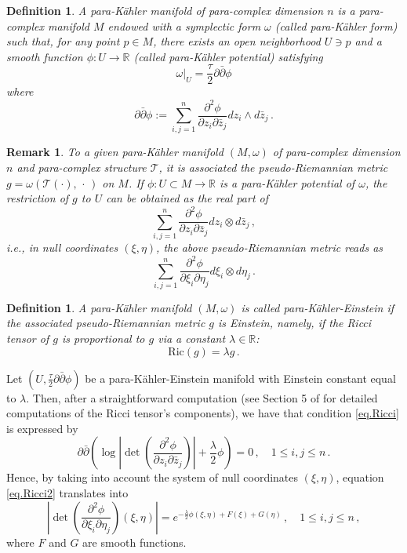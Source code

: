 \documentclass[11pt, reqno]{amsart}
\newtheorem{df}[theor]{Definition}
\newtheorem{rem}[theor]{Remark}
\newcommand{\de}{\partial}
\newcommand{\R}{\mathds{R}}
\newcommand{\KE }{K\"{a}hler-Einstein }
\newcommand{\pk }{para-K\"{a}hler }
\begin{document}
\begin{df}\label{pk}
A \emph{\pk manifold}  of para-complex dimension $n$ is a para-complex manifold $M$ endowed with a symplectic form $\omega$ (called \emph{\pk form}) such that, for any point $p\in M$, there exists an open neighborhood $U\ni p$ and  a smooth function $\phi:U\to \R$ (called \emph{\pk potential}) satisfying
$$
\omega|_{U}= \frac{\tau}{2}\de\bar\de \phi
$$ 
where
\begin{equation*}\label{eq:di.dibarra.phi}
\de\bar\de\phi:=\sum_{i,j=1}^n\frac{\de^2\phi}{\de z_i\de \bar z_j}dz_i\wedge d\bar z_j\,.
\end{equation*}
\end{df}
\begin{rem}\label{rem.pot}
To a given \pk manifold $(M ,\omega)$ of para-complex dimension $n$ and para-complex structure $\mathcal{T}$, it is associated the pseudo-Riemannian  metric 
$g=\omega\left(\mathcal{T}(\cdot),\,\cdot\,\right)$ on $M$. If $\phi:U\subset M\to\R$ is a \pk potential of $\omega$, the restriction of $g$ to $U$ can be obtained as the real part of 
$$
\sum_{i,j=1}^n\frac{\de^2\phi}{\de z_i\de \bar z_j}dz_i\otimes d\bar z_j\,,
$$
i.e., in null coordinates $(\xi,\eta)$, the above pseudo-Riemannian metric reads as
\begin{equation}\label{eq:metric.from.pot}
\sum_{i,j=1}^n\frac{\de^2\phi}{\de \xi_i\de  \eta_j}d\xi_i\otimes d \eta_j\,.
\end{equation}
\end{rem}
\begin{df}\label{pke}
A \pk manifold $(M ,\omega)$ is called \emph{para-\KE} if  the associated pseudo-Riemannian metric $g$ is Einstein, namely, if the Ricci tensor of $g$ is proportional to $g$ via a constant $\lambda \in \R$:
\begin{equation}\label{eq.Ricci}
\mathrm{Ric}(g)=\lambda g\,.
\end{equation}
\end{df}
%
%
Let  $\left(U,\frac{\tau}{2}\de\bar\de \phi\right)$ be a para-\KE manifold with Einstein constant equal to $\lambda$. Then, after a straightforward computation (see Section 5 of \cite{amt}  for detailed computations of the Ricci tensor's components), we have that condition \eqref{eq.Ricci} is expressed by
\begin{equation}\label{eq.Ricci2}
\de\bar\de\left(\log \left|\det\left( \frac{\de^2 \phi}{\de z_i\de \bar z_j}\right)\right|+\frac{\lambda}{2}\phi\right)=0\,, \quad 1\leq i,j\leq n\,.
\end{equation}
 Hence, by taking into account  the system of null coordinates $(\xi,\eta)$, equation \eqref{eq.Ricci2} translates into
\begin{equation}\label{invdiast}
\left|\det\left( \frac{\de^2 \phi}{\de \xi_i\de \eta_j}\right)(\xi,\eta)\right|=e^{-\frac{\lambda}{2}\phi(\xi,\eta)+F(\xi)+G(\eta)}\,, \quad 1\leq i,j\leq n\,,
\end{equation}
%
where $F$ and $G$ are smooth functions.
 
\end{document}
